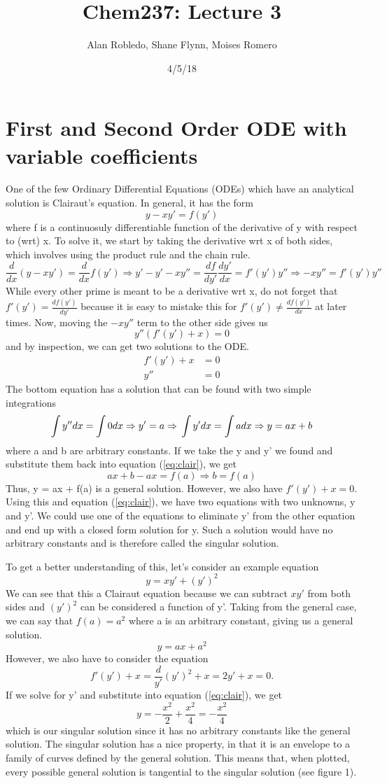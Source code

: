 \documentclass{article}
\title{Chem237: Lecture 3}
\date{4/5/18}
\author{Alan Robledo, Shane Flynn, Moises Romero}
\newcommand{\be}{\begin{equation}}
\newcommand{\ee}{\end{equation}}
\begin{document}
\maketitle
\section*{First and Second Order ODE with variable coefficients}
One of the few Ordinary Differential Equations (ODEs) which have an analytical solution is Clairaut's equation.
In general, it has the form
\be \label{eq:clair}
y - x y' = f(y')
\ee
where f is a continuosuly differentiable function of the derivative of y with respect to (wrt) x.
To solve it, we start by taking the derivative wrt x of both sides, which involves using the product rule and the chain rule.
\be
\frac{d}{dx} (y - x y') = \frac{d}{dx}f(y') \Rightarrow y' - y' - xy'' = \frac{df}{dy'} \frac{dy'}{dx} = f'(y') y''
\Rightarrow -xy'' = f'(y') y''
\ee
While every other prime is meant to be a derivative wrt x, do not forget that $f'(y') = \frac{df(y')}{dy'}$ because it is easy to mistake this for $f'(y') \neq \frac{df(y')}{dx}$ at later times.
Now, moving the $-xy''$ term to the other side gives us
\be
y''(f'(y') + x) = 0
\ee
and by inspection, we can get two solutions to the ODE.
\be
\begin{split}
f'(y') + x &= 0 \\
y'' &= 0
\end{split}
\ee
The bottom equation has a solution that can be found with two simple integrations
\be
\int y'' dx = \int 0 dx \Rightarrow y' = a \Rightarrow \\
\int y' dx = \int a dx \Rightarrow y = ax + b
\ee
where a and b are arbitrary constants.
If we take the y and y' we found and substitute them back into equation (\ref{eq:clair}), we get
\be
ax + b - ax = f(a) \Rightarrow b = f(a)
\ee
Thus, y = ax + f(a) is a general solution.
However, we also have $f'(y') + x = 0$.
Using this and equation (\ref{eq:clair}), we have two equations with two unknowns, y and y'.
We could use one of the equations to eliminate y' from the other equation and end up with a closed form solution for y.
Such a solution would have no arbitrary constants and is therefore called the singular solution.

To get a better understanding of this, let's consider an example equation
\be
y = x y' + (y')^2
\ee
We can see that this a Clairaut equation because we can subtract $xy'$ from both sides and $(y')^2$ can be considered a function of y'.
Taking from the general case, we can say that $f(a) = a^2$ where a is an arbitrary constant, giving us a general solution.
\be
y = ax + a^2
\ee
However, we also have to consider the equation
\be
f'(y') + x = \frac{d}{y'} (y')^2 + x = 2y' + x = 0.
\ee
If we solve for y' and substitute into equation (\ref{eq:clair}), we get
\be
y = -\frac{x^2}{2} + \frac{x^2}{4} = -\frac{x^2}{4}
\ee
which is our singular solution since it has no arbitrary constants like the general solution.
The singular solution has a nice property, in that it is an envelope to a family of curves defined by the general solution.
This means that, when plotted, every possible general solution is tangential to the singular solution (see figure 1).
\end{document}
